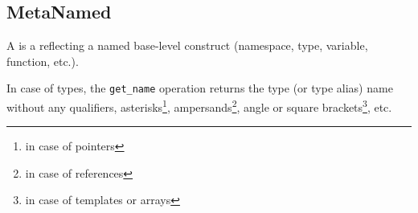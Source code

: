 \subsection{MetaNamed}
\label{concept-MetaNamed}

A  is a  reflecting a named base-level construct
(namespace, type, variable, function, etc.).





In case of types, the \texttt{get\_name} operation returns the type (or type alias)
name without any qualifiers, asterisks\footnote{in case of pointers},
ampersands\footnote{in case of references}, angle or square brackets\footnote{
in case of templates or arrays}, etc.
